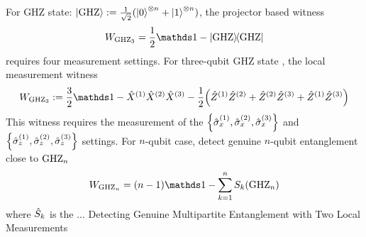 \begin{example}[GHZ]\label{exm:ghz}
	For GHZ state: $\ket{\text{GHZ}}:=\frac{1}{\sqrt{2}}(\ket{0}^{\otimes n} + \ket{1}^{\otimes n} )$,
	the projector based witness 
	\begin{equation}
		\ew_{\ghz_3}= \frac{1}{2} \identity - \op{\ghz}
	\end{equation}
	requires four measurement settings.
	For three-qubit GHZ state 
	\cite{tothDetectingGenuineMultipartite2005},
	the local measurement witness
	\begin{equation}
		\ew_{\ghz_3} := \frac{3}{2} \identity - \px^{(1)}\px^{(2)}\px^{(3)}
		- \frac{1}{2} \qty(
			\pz^{(1)} \pz^{(2)} + 
			\pz^{(2)} \pz^{(3)} + 
			\pz^{(1)} \pz^{(3)} 
		)
	\end{equation}
	This witness requires the measurement of the $\qty{\hat{\sigma}_x^{(1)},\hat{\sigma}_x^{(2)},\hat{\sigma}_x^{(3)}}$ and $\qty{\hat{\sigma}_z^{(1)},\hat{\sigma}_z^{(2)},\hat{\sigma}_z^{(3)}}$ settings.
	For $n$-qubit case, detect genuine $n$-qubit entanglement close to $\text{GHZ}_n$
	\begin{equation}
		\ew_{\ghz_n} = (n-1) \identity - \sum_{k=1}^n S_k{(\ghz_n)}
	\end{equation}
	where $\hat{S}_k$ is the  ... \cite{tothEntanglementDetectionStabilizer2005}
	Detecting Genuine Multipartite Entanglement with Two Local Measurements \cite{tothDetectingGenuineMultipartite2005}
\end{example}


